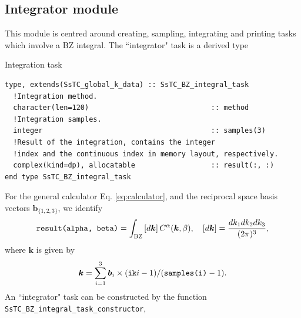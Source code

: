 \documentclass[10pt,a4paper]{article}
\begin{document}
\subsection{Integrator module}
This module is centred around creating, sampling, integrating and printing tasks which involve a BZ integral. The ``integrator" task is a derived type
\begin{codebox}{Integration task}
\begin{lstlisting}[caption={Derived type corresponding to a ``integrator" task.},captionpos=b]
type, extends(SsTC_global_k_data) :: SsTC_BZ_integral_task
  !Integration method.
  character(len=120)                             :: method
  !Integration samples.
  integer                                        :: samples(3)
  !Result of the integration, contains the integer
  !index and the continuous index in memory layout, respectively.
  complex(kind=dp), allocatable                  :: result(:, :)
end type SsTC_BZ_integral_task
\end{lstlisting}
\end{codebox}
For the general calculator Eq. \eqref{eq:calculator}, and the reciprocal space basis vectors $\bm{b}_{\{1, 2, 3\}}$, we identify
\begin{equation}\label{eq:integrator}
\verb|result(alpha, beta)| = \int_{\text{BZ}} \left[d\bm{k}\right]C^{\alpha}(\bm{k},\beta),\quad \left[d\bm{k}\right] = \frac{dk_1 dk_2 dk_3}{(2\pi)^3},
\end{equation}
where $\bm{k}$ is given by
\begin{equation}\label{eq:vec_coords_integrator}
\bm{k} = \sum_{i=1}^3 \bm{b}_i\times (\verb|ik|i-1)/(\verb|samples(i)| - 1).
\end{equation}
An ``integrator" task can be constructed by the function \verb|SsTC_BZ_integral_task_constructor|,
\end{document}
